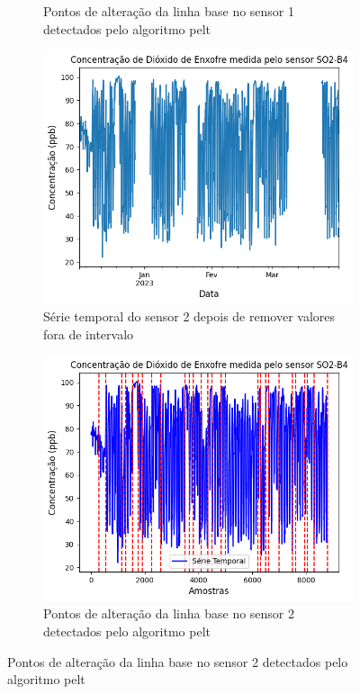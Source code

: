 \begin{figure}[h!]
\begin{subfigure}{0.495\textwidth}
        \caption{Pontos de alteração da linha base no sensor 1 detectados pelo algoritmo \acrshort{pelt}}
        \label{fig:data-rebase-so2-1}
    \end{subfigure}
    \hfill
    \begin{subfigure}{0.495\textwidth}
        \includegraphics[width=\textwidth]{aftertext/Leituras SO2/raw-so2-b4-2.png}
        \caption{Série temporal do sensor 2 depois de remover valores fora de intervalo}
        \label{fig:data-so2-2-raw}
    \end{subfigure}
    \hfill
    \begin{subfigure}{0.495\textwidth}
        \includegraphics[width=\textwidth]{aftertext/Leituras SO2/rebase-so2-b4-2.png}
        \caption{Pontos de alteração da linha base no sensor 2 detectados pelo algoritmo \acrshort{pelt}}
        \label{fig:data-rebase-so2-2}
    \end{subfigure}
    \label{fig:data-so2-raw-and-pelt}
\end{figure}

